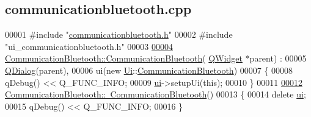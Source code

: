 \hypertarget{communicationbluetooth_8cpp_source}{}\subsection{communicationbluetooth.\+cpp}

\begin{DoxyCode}
00001 \textcolor{preprocessor}{#include "\hyperlink{communicationbluetooth_8h}{communicationbluetooth.h}"}
00002 \textcolor{preprocessor}{#include "ui\_communicationbluetooth.h"}
00003 
\hyperlink{class_communication_bluetooth_a30f88d1710eb41d9c8c4b390b5c7b6f7}{00004} \hyperlink{class_communication_bluetooth_a30f88d1710eb41d9c8c4b390b5c7b6f7}{CommunicationBluetooth::CommunicationBluetooth}(
      \hyperlink{class_q_widget}{QWidget} *parent) :
00005     \hyperlink{class_q_dialog}{QDialog}(parent),
00006     ui(new \hyperlink{namespace_ui}{Ui}::\hyperlink{class_communication_bluetooth}{CommunicationBluetooth})
00007 \{
00008      qDebug() << Q\_FUNC\_INFO;
00009     \hyperlink{class_communication_bluetooth_a2721cf9f9503a98770981ffdad09f9a1}{ui}->setupUi(\textcolor{keyword}{this});
00010 \}
00011 
\hyperlink{class_communication_bluetooth_a13c72d24359f40c204e94f3ef1ab6fd3}{00012} \hyperlink{class_communication_bluetooth_a13c72d24359f40c204e94f3ef1ab6fd3}{CommunicationBluetooth::~CommunicationBluetooth}()
00013 \{
00014     \textcolor{keyword}{delete} \hyperlink{class_communication_bluetooth_a2721cf9f9503a98770981ffdad09f9a1}{ui};
00015     qDebug() << Q\_FUNC\_INFO;
00016 \}
\end{DoxyCode}
